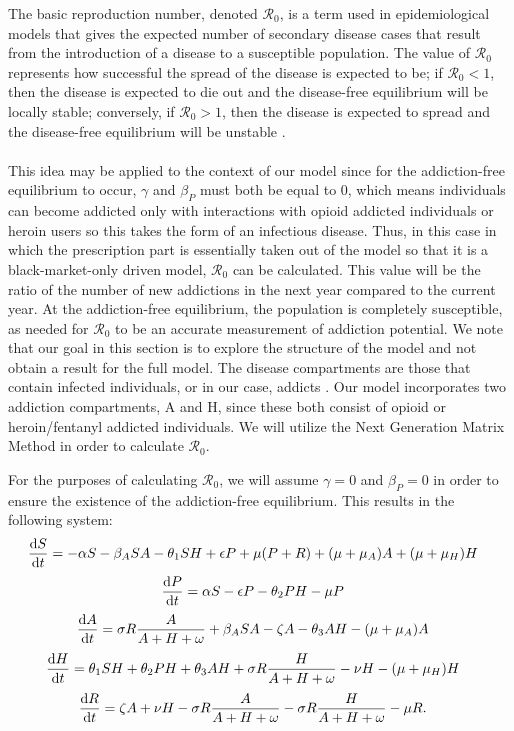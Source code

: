 \documentclass[12pt]{article}
\begin{document}
The basic reproduction number, denoted $\mathscr{R}_0$, is a term used in epidemiological models that gives the expected number of secondary disease cases that result from the introduction of a disease to a susceptible population. The value of $\mathscr{R}_0$ represents how successful the spread of the disease is expected to be; if $\mathscr{R}_0 < 1$, then the disease is expected to die out and the disease-free equilibrium will be locally stable; conversely, if $\mathscr{R}_0 >1$, then the disease is expected to spread and the disease-free equilibrium will be unstable \cite{Driessche}. \\ \\
 This idea may be applied to the context of our model since for the addiction-free equilibrium to occur, $\gamma$ and $\beta_{P}$ must both be equal to 0, which means individuals can become addicted only with interactions with opioid addicted individuals or heroin users so this takes the form of an infectious disease. Thus, in this case in which the prescription part is essentially taken out of the model so that it is a black-market-only driven model, $\mathscr{R}_0$ can be calculated. This value will be the ratio of the number of new addictions in the next year compared to the current year. At the addiction-free equilibrium, the population is completely susceptible, as needed for $\mathscr{R}_0$ to be an accurate measurement of addiction potential. 
We note that our goal in this section is to explore the structure of the model and not obtain a result for the full model. The disease compartments are those that contain infected individuals, or in our case, addicts \cite{Driessche}. Our model incorporates two addiction compartments, A and H, since these both consist of opioid or heroin/fentanyl addicted individuals. We will utilize the Next Generation Matrix Method in order to calculate $\mathscr{R}_0$.


For the purposes of calculating $\mathscr{R}_0$, we will assume $\gamma =0$ and $\beta_{P} =0$ in order to ensure the existence of the addiction-free equilibrium. This results in the following system:
\[\dv{S}{t} = -\alpha S - \beta_{A} SA  - \theta_{1} SH +\epsilon P +\mu (P+R) + (\mu+\mu_{A})A + (\mu+\mu_{H}) H \quad \] 
\[\dv{P}{t} = \alpha S - \epsilon P  - \theta_{2}PH- \mu P    \quad\]
\[\dv{A}{t} = \sigma R \frac{A}{A+H+\omega} +\beta_{A} SA  -\zeta A - \theta_{3}AH-(\mu + \mu_{A})A   \quad\]
\[\dv{H}{t} = \theta_{1}SH+\theta_{2}PH+\theta_{3}AH + \sigma R \frac{H}{A+H+\omega}-\nu H-(\mu+\mu_{H})H  \quad\]
\[\dv{R}{t} = \zeta A +\nu H -\sigma R \frac{A}{A+H+\omega}-\sigma R \frac{H}{A+H+\omega} -\mu R.\quad\]
\end{document}

